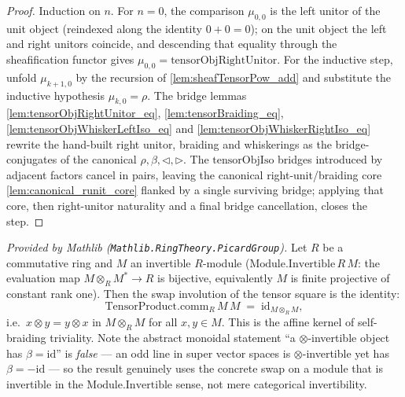 \begin{proof}
  \leanok
  Induction on \(n\). For \(n = 0\), the comparison \(\mu_{0,0}\) is the left unitor
  of the unit object (reindexed along the identity \(0 + 0 = 0\)); on the unit
  object the left and right unitors coincide, and descending that equality through
  the sheafification functor gives \(\mu_{0,0} = \mathrm{tensorObjRightUnitor}\).
  For the inductive step, unfold \(\mu_{k+1,0}\) by the recursion of
  \cref{lem:sheafTensorPow_add} and substitute the inductive hypothesis
  \(\mu_{k,0} = \rho\). The bridge lemmas
  \cref{lem:tensorObjRightUnitor_eq}, \cref{lem:tensorBraiding_eq},
  \cref{lem:tensorObjWhiskerLeftIso_eq} and \cref{lem:tensorObjWhiskerRightIso_eq}
  rewrite the hand-built right unitor, braiding and whiskerings as the
  bridge-conjugates of the canonical \(\rho, \beta, \lhd, \rhd\). The
  \(\mathrm{tensorObjIso}\) bridges introduced by adjacent factors cancel in pairs,
  leaving the canonical right-unit/braiding core \cref{lem:canonical_runit_core}
  flanked by a single surviving bridge; applying that core, then right-unitor
  naturality and a final bridge cancellation, closes the step.
\end{proof}

\begin{lemma}
  \label{lem:tensorProductComm_eq_refl_mathlib}
  \mathlibok
  \textit{Provided by Mathlib (\texttt{Mathlib.RingTheory.PicardGroup}).}
  Let \(R\) be a commutative ring and \(M\) an invertible \(R\)-module
  (\(\mathrm{Module.Invertible}\,R\,M\): the evaluation map
  \(M \otimes_R M^{\ast} \to R\) is bijective, equivalently \(M\) is finite
  projective of constant rank one). Then the swap involution of the tensor square
  is the identity:
  \[
    \mathrm{TensorProduct.comm}_R\,M\,M \;=\;
      \mathrm{id}_{M \otimes_R M},
  \]
  i.e.\ \(x \otimes y = y \otimes x\) in \(M \otimes_R M\) for all
  \(x, y \in M\). This is the affine kernel of self-braiding triviality. Note the
  abstract monoidal statement ``a \(\otimes\)-invertible object has
  \(\beta = \mathrm{id}\)'' is \emph{false} --- an odd line in super vector spaces
  is \(\otimes\)-invertible yet has \(\beta = -\mathrm{id}\) --- so the result
  genuinely uses the concrete swap on a module that is invertible in the
  \(\mathrm{Module.Invertible}\) sense, not mere categorical invertibility.
\end{lemma}

